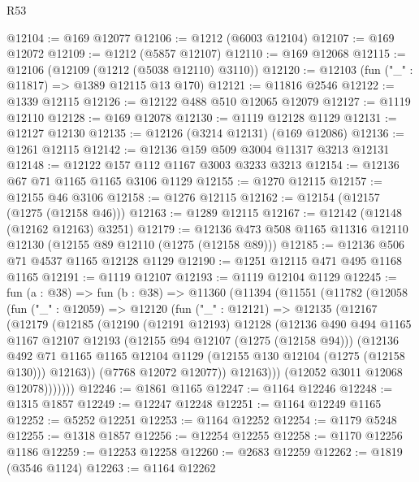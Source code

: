 \begin{lexlean}{R53}
\begin{coremodule}
@12104 := @169 @12077
@12106 := @1212 (@6003 @12104)
@12107 := @169 @12072
@12109 := @1212 (@5857 @12107)
@12110 := @169 @12068
@12115 := @12106 (@12109 (@1212 (@5038 @12110) @3110))
@12120 := @12103 (fun ("_" : @11817) => @1389 @12115 @13 @170)
@12121 := @11816 @2546
@12122 := @1339 @12115
@12126 := @12122 @488 @510 @12065 @12079
@12127 := @1119 @12110
@12128 := @169 @12078
@12130 := @1119 @12128 @1129
@12131 := @12127 @12130
@12135 := @12126 (@3214 @12131) (@169 @12086)
@12136 := @1261 @12115
@12142 := @12136 @159 @509 @3004 @11317 @3213 @12131
@12148 := @12122 @157 @112 @1167 @3003 @3233 @3213
@12154 := @12136 @67 @71 @1165 @1165 @3106 @1129
@12155 := @1270 @12115
@12157 := @12155 @46 @3106
@12158 := @1276 @12115
@12162 := @12154 (@12157 (@1275 (@12158 @46)))
@12163 := @1289 @12115
@12167 := @12142 (@12148 (@12162 @12163) @3251)
@12179 := @12136 @473 @508 @1165 @11316 @12110 @12130 (@12155 @89 @12110 (@1275 (@12158 @89)))
@12185 := @12136 @506 @71 @4537 @1165 @12128 @1129
@12190 := @1251 @12115 @471 @495 @1168 @1165
@12191 := @1119 @12107
@12193 := @1119 @12104 @1129
@12245 := fun (a : @38) =>
  fun (b : @38) =>
  @11360
    (@11394
      (@11551
        (@11782
          (@12058
            (fun ("_" : @12059) =>
            @12120
              (fun ("_" : @12121) =>
              @12135
                (@12167
                  (@12179
                    (@12185
                      (@12190
                        (@12191 @12193)
                        @12128
                        (@12136
                          @490
                          @494
                          @1165
                          @1167
                          @12107
                          @12193
                          (@12155 @94 @12107 (@1275 (@12158 @94)))
                          (@12136
                            @492
                            @71
                            @1165
                            @1165
                            @12104
                            @1129
                            (@12155 @130 @12104 (@1275 (@12158 @130)))
                            @12163))
                        (@7768 @12072 @12077))
                      @12163)))
                (@12052 @3011 @12068 @12078)))))))
@12246 := @1861 @1165
@12247 := @1164 @12246
@12248 := @1315 @1857
@12249 := @12247 @12248
@12251 := @1164 @12249 @1165
@12252 := @5252 @12251
@12253 := @1164 @12252
@12254 := @1179 @5248
@12255 := @1318 @1857
@12256 := @12254 @12255
@12258 := @1170 @12256 @1186
@12259 := @12253 @12258
@12260 := @2683 @12259
@12262 := @1819 (@3546 @1124)
@12263 := @1164 @12262

\end{coremodule}
\end{lexlean}
